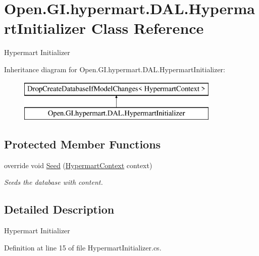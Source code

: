 \hypertarget{class_open_1_1_g_i_1_1hypermart_1_1_d_a_l_1_1_hypermart_initializer}{}\section{Open.\+G\+I.\+hypermart.\+D\+A\+L.\+Hypermart\+Initializer Class Reference}
\label{class_open_1_1_g_i_1_1hypermart_1_1_d_a_l_1_1_hypermart_initializer}


Hypermart Initializer  


Inheritance diagram for Open.\+G\+I.\+hypermart.\+D\+A\+L.\+Hypermart\+Initializer\+:\begin{figure}[H]
\begin{center}
\leavevmode
\includegraphics[height=2.000000cm]{class_open_1_1_g_i_1_1hypermart_1_1_d_a_l_1_1_hypermart_initializer}
\end{center}
\end{figure}
\subsection*{Protected Member Functions}
\begin{DoxyCompactItemize}
\item 
override void \hyperlink{class_open_1_1_g_i_1_1hypermart_1_1_d_a_l_1_1_hypermart_initializer_a2e19732fa6f8db0a6b72049415947016}{Seed} (\hyperlink{class_open_1_1_g_i_1_1hypermart_1_1_d_a_l_1_1_hypermart_context}{Hypermart\+Context} context)
\begin{DoxyCompactList}\small\item\em Seeds the database with content. \end{DoxyCompactList}\end{DoxyCompactItemize}


\subsection{Detailed Description}
Hypermart Initializer 



Definition at line 15 of file Hypermart\+Initializer.\+cs.



